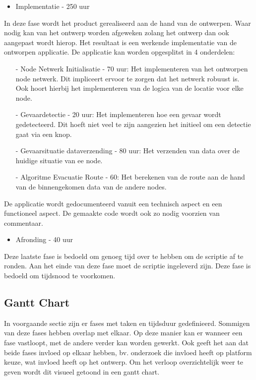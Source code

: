 \documentclass{../local}
\begin{document}
\begin{itemize}
\item Implementatie - 250 uur
\end{itemize}
In deze fase wordt het product gerealiseerd aan de hand van de ontwerpen. Waar nodig kan van het ontwerp worden afgeweken zolang het ontwerp dan ook aangepast wordt hierop. Het resultaat is een werkende implementatie van de ontworpen applicatie. De applicatie kan worden opgesplitst in 4 onderdelen:
\begin{itemize}
\item[-] Node Netwerk Initialisatie - 70 uur: Het implementeren van het ontworpen node netwerk. Dit impliceert ervoor te zorgen dat het netwerk robuust is. Ook hoort hierbij het implementeren van de logica van de locatie voor elke node.
\item[-] Gevaardetectie - 20 uur: Het implementeren hoe een gevaar wordt gedetecteerd. Dit hoeft niet veel te zijn aangezien het initieel om een detectie gaat via een knop.
\item[-] Gevaarsituatie dataverzending - 80 uur: Het verzenden van data over de huidige situatie van ee node. 
\item[-] Algoritme Evacuatie Route - 60: Het berekenen van de route aan de hand van de binnengekomen data van de andere nodes. 
\end{itemize}

\noindent De applicatie wordt gedocumenteerd vanuit een technisch aspect en een functioneel aspect. De gemaakte code wordt ook zo nodig voorzien van commentaar. 

\begin{itemize}
\item Afronding - 40 uur
\end{itemize}
Deze laatste fase is bedoeld om genoeg tijd over te hebben om de scriptie af te ronden. Aan het einde van deze fase moet de scriptie ingeleverd zijn. Deze fase is bedoeld om tijdsnood te voorkomen.

\subsection{Gantt Chart}
In voorgaande sectie zijn er fases met taken en tijdsduur gedefinieerd. Sommigen van deze fases hebben overlap met elkaar. Op deze manier kan er wanneer een fase vastloopt, met de andere verder kan worden gewerkt. Ook geeft het aan dat beide fases invloed op elkaar hebben, bv. onderzoek die invloed heeft op platform keuze, wat invloed heeft op het ontwerp. Om het verloop overzichtelijk weer te geven wordt dit visueel getoond in een gantt chart.
\end{document}
